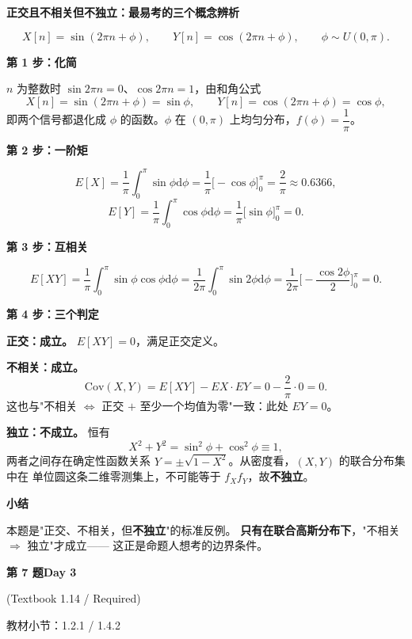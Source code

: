\documentclass[10.5pt,fontset=fandol]{ctexart}
\newcommand{\key}[1]{\par\vspace{4pt}\noindent\textbf{\color{navy}#1}\par\vspace{2pt}}
\newcommand{\dd}{\mathrm d}\newcommand{\Var}{\operatorname{Var}}\newcommand{\Cov}{\operatorname{Cov}}
\newcommand{\qtitle}[2]{\par\addvspace{1.2em}\Needspace{8\baselineskip}\begin{tcolorbox}[colback=navy,colframe=navy,arc=1.5pt,boxrule=0pt]\color{white}\large\bfseries #1\hfill\small #2\end{tcolorbox}}
\begin{document}
\noindent\textbf{正交且不相关但不独立：最易考的三个概念辨析}\par\smallskip\begin{tcolorbox}[breakable,colback=qbg,colframe=qbg,boxrule=0pt]\[
X[n]=\sin(2\pi n+\phi),\qquad Y[n]=\cos(2\pi n+\phi),\qquad \phi\sim U(0,\pi).
\]

\key{第 1 步：化简}
$n$ 为整数时 $\sin2\pi n=0$、$\cos2\pi n=1$，由和角公式
\[
X[n]=\sin(2\pi n+\phi)=\sin\phi,\qquad Y[n]=\cos(2\pi n+\phi)=\cos\phi ,
\]
即两个信号都退化成 $\phi$ 的函数。$\phi$ 在 $(0,\pi)$ 上均匀分布，$f(\phi)=\dfrac1\pi$。

\key{第 2 步：一阶矩}
\[
E[X]=\frac1\pi\int_0^\pi\sin\phi\dd\phi=\frac1\pi\big[-\cos\phi\big]_0^\pi=\frac{2}{\pi}\approx0.6366,
\]
\[
E[Y]=\frac1\pi\int_0^\pi\cos\phi\dd\phi=\frac1\pi\big[\sin\phi\big]_0^\pi=0 .
\]

\key{第 3 步：互相关}
\[
E[XY]=\frac1\pi\int_0^\pi\sin\phi\cos\phi\dd\phi
=\frac{1}{2\pi}\int_0^\pi\sin2\phi\dd\phi
=\frac{1}{2\pi}\Big[-\frac{\cos2\phi}{2}\Big]_0^\pi=0 .
\]

\key{第 4 步：三个判定}
\begin{bul}
  \item \textbf{正交：成立。} $E[XY]=0$，满足正交定义。
  \item \textbf{不相关：成立。}
        \[
        \mathrm{Cov}(X,Y)=E[XY]-EX\cdot EY=0-\frac{2}{\pi}\cdot0=0 .
        \]
        这也与"不相关 $\Leftrightarrow$ 正交 $+$ 至少一个均值为零"一致：此处 $EY=0$。
  \item \textbf{独立：不成立。} 恒有
        \[
        X^2+Y^2=\sin^2\phi+\cos^2\phi\equiv1 ,
        \]
        两者之间存在确定性函数关系 $Y=\pm\sqrt{1-X^2}$。从密度看，$(X,Y)$ 的联合分布集中在
        单位圆这条二维零测集上，不可能等于 $f_Xf_Y$，故\textbf{不独立}。
\end{bul}

\key{小结}
本题是"正交、不相关，但\textbf{不独立}"的标准反例。
\textbf{只有在联合高斯分布下}，"不相关 $\Rightarrow$ 独立"才成立——
这正是命题人想考的边界条件。
\end{tcolorbox}
\qtitle{第 7 题}{Day 3}
{\small\color{accentred}(Textbook 1.14 / Required)}\par\smallskip
{\small\color{muted}教材小节：1.2.1 / 1.4.2}\par\medskip
\end{document}
